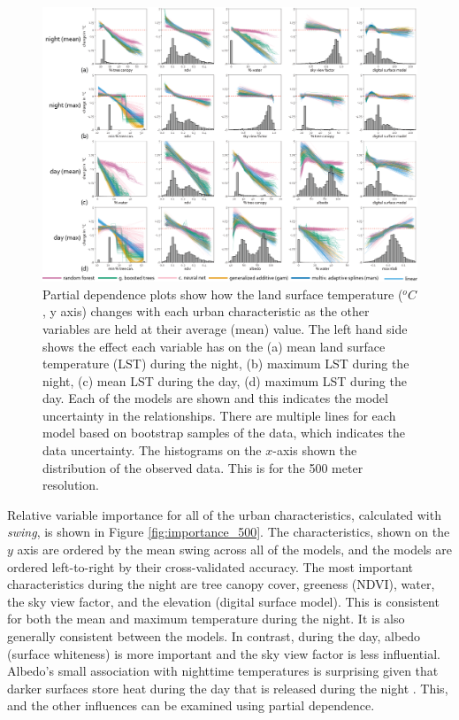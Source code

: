 \documentclass[final,3p,times,twocolumn,sort&compress]{elsarticle}
\begin{document}
\begin{figure}
    \centering
    \includegraphics[width=\linewidth]{fig/report/pdp_500.png}
    \caption[Partial dependence plots for LST at 500 meter resolution]{
    Partial dependence plots show how the land surface temperature ($^oC$, y axis) changes with each urban characteristic as the other variables are held at their average (mean) value. 
    The left hand side shows the effect each variable has on the (a) mean land surface temperature (LST) during the night, (b) maximum LST during the night, (c) mean LST during the day, (d) maximum LST during the day. 
    Each of the models are shown and this indicates the model uncertainty in the relationships.
    There are multiple lines for each model based on bootstrap samples of the data, which indicates the data uncertainty.
    The histograms on the $x$-axis shown the distribution of the observed data.
    This is for the 500 meter resolution.
    }
    \label{fig:pdp_500}
\end{figure}


Relative variable importance for all of the urban characteristics, calculated with \textit{swing}, is shown in Figure \ref{fig:importance_500}. 
The characteristics, shown on the $y$ axis are ordered by the mean swing across all of the models, and the models are ordered left-to-right by their cross-validated accuracy.
The most important characteristics during the night are tree canopy cover, greeness (NDVI), water, the sky view factor, and the elevation (digital surface model).
This is consistent for both the mean and maximum temperature during the night.
It is also generally consistent between the models. 
In contrast, during the day, albedo (surface whiteness) is more important and the sky view factor is less influential.
Albedo's small association with nighttime temperatures is surprising given that darker surfaces store heat during the day that is released during the night \cite{Voogt2003-mm, Zhou2014-wc}.
This, and the other influences can be examined using partial dependence.
\end{document}
